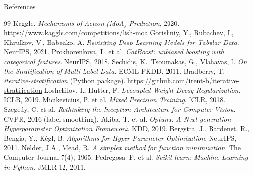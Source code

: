 \documentclass[aspectratio=169,10pt]{beamer}
\begin{document}
\begin{frame}{References}
\footnotesize
\tiny
\begin{thebibliography}{99}
 Kaggle. \emph{Mechanisms of Action (MoA) Prediction}, 2020. \url{https://www.kaggle.com/competitions/lish-moa}
 Gorishniy, Y., Rubachev, I., Khrulkov, V., Babenko, A. \emph{Revisiting Deep Learning Models for Tabular Data}. NeurIPS, 2021.
 Prokhorenkova, L. et al. \emph{CatBoost: unbiased boosting with categorical features}. NeurIPS, 2018.
 Sechidis, K., Tsoumakas, G., Vlahavas, I. \emph{On the Stratification of Multi-Label Data}. ECML PKDD, 2011.
 Bradberry, T. \emph{iterative-stratification} (Python package). \url{https://github.com/trent-b/iterative-stratification}
 Loshchilov, I., Hutter, F. \emph{Decoupled Weight Decay Regularization}. ICLR, 2019.
 Micikevicius, P. et al. \emph{Mixed Precision Training}. ICLR, 2018.
 Szegedy, C. et al. \emph{Rethinking the Inception Architecture for Computer Vision}. CVPR, 2016 (label smoothing).
 Akiba, T. et al. \emph{Optuna: A Next-generation Hyperparameter Optimization Framework}. KDD, 2019.
 Bergstra, J., Bardenet, R., Bengio, Y., K\'egl, B. \emph{Algorithms for Hyper-Parameter Optimization}. NeurIPS, 2011.
 Nelder, J.A., Mead, R. \emph{A simplex method for function minimization}. The Computer Journal 7(4), 1965.
 Pedregosa, F. et al. \emph{Scikit-learn: Machine Learning in Python}. JMLR 12, 2011.
\end{thebibliography}
\end{frame}
\end{document}
